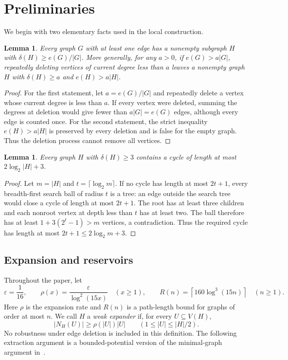 \documentclass[10pt,letterpaper]{article}
\newtheorem{lemma}[theorem]{Lemma}
\theoremstyle{definition}
\theoremstyle{remark}
\newcommand{\eps}{\varepsilon}
\begin{document}
\section{Preliminaries}\label{sec:preliminaries}

We begin with two elementary facts used in the local construction.

\begin{lemma}\label{lem:prune}
Every graph $G$ with at least one edge has a nonempty subgraph $H$ with $\delta(H)\ge e(G)/|G|$. More generally, for any $a>0$, if $e(G)>a|G|$, repeatedly deleting vertices of current degree less than $a$ leaves a nonempty graph $H$ with $\delta(H)\ge a$ and $e(H)>a|H|$.
\end{lemma}
\begin{proof}
For the first statement, let $a=e(G)/|G|$ and repeatedly delete a vertex whose current degree is less than $a$. If every vertex were deleted, summing the degrees at deletion would give fewer than $a|G|=e(G)$ edges, although every edge is counted once. For the second statement, the strict inequality $e(H)>a|H|$ is preserved by every deletion and is false for the empty graph. Thus the deletion process cannot remove all vertices.
\end{proof}

\begin{lemma}\label{lem:shortcycle}
Every graph $H$ with $\delta(H)\ge3$ contains a cycle of length at most $2\log_2|H|+3$.
\end{lemma}
\begin{proof}
Let $m=|H|$ and $t=\lceil\log_2m\rceil$. If no cycle has length at most $2t+1$, every breadth-first search ball of radius $t$ is a tree: an edge outside the search tree would close a cycle of length at most $2t+1$. The root has at least three children and each nonroot vertex at depth less than $t$ has at least two. The ball therefore has at least $1+3(2^t-1)>m$ vertices, a contradiction. Thus the required cycle has length at most $2t+1\le2\log_2m+3$.
\end{proof}

\subsection{Expansion and reservoirs}

Throughout the paper, let
\[
\eps=\frac1{16},\qquad
\rho(x)=\frac{\eps}{\log^2(15x)}\quad(x\ge1),\qquad
R(n)=\left\lceil160\log^3(15n)\right\rceil\quad(n\ge1).
\]
Here $\rho$ is the expansion rate and $R(n)$ is a path-length bound for graphs of order at most $n$. We call $H$ a \emph{weak expander} if, for every $U\subseteq V(H)$,
\begin{equation}\label{eq:expand}
|N_H(U)|\ge\rho(|U|)|U|
\qquad(1\le|U|\le |H|/2).
\end{equation}
No robustness under edge deletion is included in this definition. The following extraction argument is a bounded-potential version of the minimal-graph argument in~\cite{AGH}.
\end{document}
